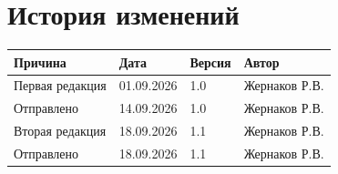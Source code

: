 \newpage


\section*{История изменений}
\noindent

\scriptsize
\begin{longtable}{|p{40mm}|p{20mm}|p{20mm}|p{60mm}|}
\hline
{\bf \parbox[c][5mm]{40mm}{\centering Причина}} & {\bf \parbox[c]{19mm}{\centering Дата}} & {\bf \parbox[c]{16mm}{\centering Версия}} & {\bf \parbox[c]{25mm}{\centering Автор}} \\
\hline
\parbox[c][9mm]{40mm}{Первая редакция} & \parbox{19mm}{01.09.2026} & \parbox{16mm}{1.0} & \parbox{60mm}{Жернаков Р.В.} \\
\hline
\parbox[c][9mm]{40mm}{Отправлено} & \parbox{19mm}{14.09.2026} & \parbox{16mm}{1.0} & \parbox{60mm}{Жернаков Р.В.} \\
\hline
\parbox[c][9mm]{40mm}{Вторая редакция} & \parbox{19mm}{18.09.2026} & \parbox{16mm}{1.1} & \parbox{60mm}{Жернаков Р.В.} \\
\hline
\parbox[c][9mm]{40mm}{Отправлено} & \parbox{19mm}{18.09.2026} & \parbox{16mm}{1.1} & \parbox{60mm}{Жернаков Р.В.} \\
\hline
\end{longtable}  
\normalsize